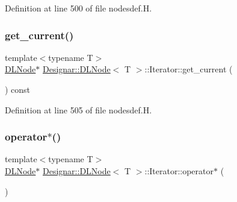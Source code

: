 Definition at line 500 of file nodesdef.\+H.

\mbox{\label{class_designar_1_1_d_l_node_1_1_iterator_a1ea2b71da1fbc4970b9a1c170ddacb13}} 
\subsubsection{\texorpdfstring{get\+\_\+current()}{get\_current()}\hspace{0.1cm}{\footnotesize\ttfamily [2/2]}}
{\footnotesize\ttfamily template$<$typename T$>$ \\
\hyperlink{class_designar_1_1_d_l_node}{D\+L\+Node}$\ast$ \hyperlink{class_designar_1_1_d_l_node}{Designar\+::\+D\+L\+Node}$<$ T $>$\+::Iterator\+::get\+\_\+current (\begin{DoxyParamCaption}{ }\end{DoxyParamCaption}) const\hspace{0.3cm}{\ttfamily [inline]}}



Definition at line 505 of file nodesdef.\+H.

\mbox{\label{class_designar_1_1_d_l_node_1_1_iterator_a37adeeda3073b950590700c3e22dcf28}} 
\subsubsection{\texorpdfstring{operator$\ast$()}{operator*()}\hspace{0.1cm}{\footnotesize\ttfamily [1/2]}}
{\footnotesize\ttfamily template$<$typename T$>$ \\
\hyperlink{class_designar_1_1_d_l_node}{D\+L\+Node}$\ast$ \hyperlink{class_designar_1_1_d_l_node}{Designar\+::\+D\+L\+Node}$<$ T $>$\+::Iterator\+::operator$\ast$ (\begin{DoxyParamCaption}{ }\end{DoxyParamCaption})\hspace{0.3cm}{\ttfamily [inline]}}



